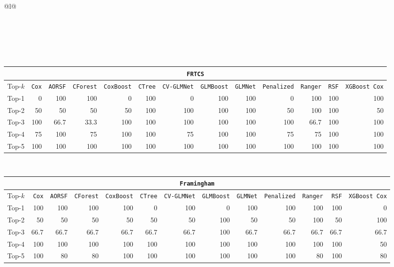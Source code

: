 \begin{longtable}{@{}l@{}}
\caption{Top-$k$ feature overlap (\%) between PFI and SurvSHAP variable rankings (based on $\bar{R}$) for $k=1,\dots,5$, across all 35 datasets and 12 survival models (SHAP $N=15$ only).}
\label{tab:pfi_shap_topk_n15} \\
\toprule
\endfirsthead

 \\
\toprule
\endhead

\midrule
{} \\
\endfoot

\bottomrule
\endlastfoot

\begin{tabular}{@{}l*{12}{r}@{}}
\multicolumn{13}{c}{\texttt{FRTCS}} \\
\midrule
Top-$k$ & \texttt{Cox} & \texttt{AORSF} & \texttt{CForest} & \texttt{CoxBoost} & \texttt{CTree} & \texttt{CV-GLMNet} & \texttt{GLMBoost} & \texttt{GLMNet} & \texttt{Penalized} & \texttt{Ranger} & \texttt{RSF} & \texttt{XGBoost Cox} \\
\midrule
Top-1 & 0 & 100 & 100 & 0 & 100 & 0 & 100 & 100 & 0 & 100 & 100 & 100 \\
Top-2 & 50 & 50 & 50 & 50 & 100 & 100 & 100 & 100 & 50 & 100 & 100 & 50 \\
Top-3 & 100 & 66.7 & 33.3 & 100 & 100 & 100 & 100 & 100 & 100 & 66.7 & 100 & 100 \\
Top-4 & 75 & 100 & 75 & 100 & 100 & 75 & 100 & 100 & 75 & 75 & 100 & 100 \\
Top-5 & 100 & 100 & 100 & 100 & 100 & 100 & 100 & 100 & 100 & 100 & 100 & 100 \\
\end{tabular} \\
\midrule

\begin{tabular}{@{}l*{12}{r}@{}}
\multicolumn{13}{c}{\texttt{Framingham}} \\
\midrule
Top-$k$ & \texttt{Cox} & \texttt{AORSF} & \texttt{CForest} & \texttt{CoxBoost} & \texttt{CTree} & \texttt{CV-GLMNet} & \texttt{GLMBoost} & \texttt{GLMNet} & \texttt{Penalized} & \texttt{Ranger} & \texttt{RSF} & \texttt{XGBoost Cox} \\
\midrule
Top-1 & 100 & 100 & 100 & 100 & 0 & 100 & 0 & 100 & 100 & 100 & 100 & 0 \\
Top-2 & 50 & 50 & 50 & 50 & 50 & 50 & 100 & 50 & 50 & 100 & 50 & 100 \\
Top-3 & 66.7 & 66.7 & 66.7 & 66.7 & 66.7 & 66.7 & 100 & 66.7 & 66.7 & 66.7 & 66.7 & 66.7 \\
Top-4 & 100 & 100 & 100 & 100 & 100 & 100 & 100 & 100 & 100 & 100 & 100 & 50 \\
Top-5 & 100 & 80 & 80 & 100 & 100 & 100 & 100 & 100 & 100 & 80 & 100 & 80 \\
\end{tabular} \\
\midrule


\end{longtable}
